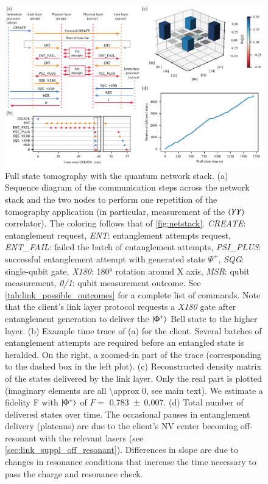 \begin{figure}
    \centering
    \includegraphics[width=\linewidth]{figures/fstomography.pdf}
    \caption{
        Full state tomography with the quantum network stack.
        (a) Sequence diagram of the communication steps across the network stack and the two
        nodes to perform one repetition of the tomography application (in particular,
        measurement of the $\braket{YY}$ correlator). The coloring follows that of
        \cref{fig:netstack}. \emph{CREATE}: entanglement request, \emph{ENT}: entanglement
        attempts request, \emph{ENT\_FAIL}: failed the batch of entanglement attempts,
        \emph{PSI\_PLUS}: successful entanglement attempt with generated state $\Psi^+$,
        \emph{SQG}: single-qubit gate, \emph{X180}: \ang{180} rotation around X axis,
        \emph{MSR}: qubit measurement, \emph{0/1}: qubit measurement outcome. See
        \cref{tab:link_possible_outcomes} for a complete list of commands. Note that the
        client's link layer protocol requests a \emph{X180} gate after entanglement
        generation to deliver the $\ket{\Phi^+}$ Bell state to the higher layer.
        (b) Example time trace of (a) for the client. Several batches of entanglement attempts
        are required before an entangled state is heralded. On the right, a zoomed-in part
        of the trace (corresponding to the dashed box in the left plot).
        (c) Reconstructed density matrix of the states delivered by the link layer. Only the
        real part is plotted (imaginary elements are all \num{\approx 0}, see main text).
        We estimate a fidelity F with $\ket{\Phi^+}$ of $F =$ \num{0.783(7)}.
        (d) Total number of delivered states over time. The occasional pauses in entanglement
        delivery (plateaus) are due to the client's NV center becoming off-resonant with
        the relevant lasers (see \cref{sec:link_suppl_off_resonant}). Differences in slope
        are due to changes in resonance conditions that increase the time necessary to
        pass the charge and resonance check.
    }
    \label{fig:fstomography}
\end{figure}

